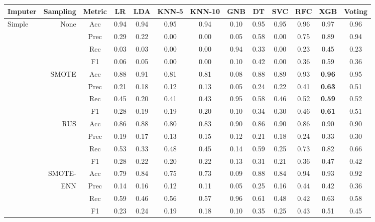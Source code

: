 \begin{table*}
\ContinuedFloat
\begin{narrow}{-1cm}{-1cm}
\begin{subtable}[t]{2.05\columnwidth}
    \centering
    \begin{tabular}{l|r|c|cccccccccc}
       Imputer & Sampling & Metric & LR & LDA & KNN-5 & KNN-10 & GNB & DT & SVC & RFC & XGB & Voting \\
        \hline \hline
        
        Simple & None & Acc & 0.94 & 0.94 & 0.95 & 0.94 & 0.10 & 0.95 & 0.95 & 0.96 & 0.97 & 0.96 \\
        ~ & ~ & Prec & 0.29 & 0.22 & 0.00 & 0.00 & 0.05 & 0.58 & 0.00 & 0.75 & 0.89 & 0.94 \\
        ~ & ~ & Rec & 0.03 & 0.03 & 0.00 & 0.00 & 0.94 & 0.33 & 0.00 & 0.23 & 0.45 & 0.23 \\
        ~ & ~ & F1 & 0.06 & 0.05 & 0.00 & 0.00 & 0.10 & 0.42 & 0.00 & 0.36 & 0.59 & 0.36 \\
        \cline{2-13}
        ~ & SMOTE & Acc & 0.88 & 0.91 & 0.81 & 0.81 & 0.08 & 0.88 & 0.89 & 0.93 & \textbf{0.96} & 0.95 \\
        ~ & ~ & Prec & 0.21 & 0.18 & 0.12 & 0.13 & 0.05 & 0.24 & 0.22 & 0.41 & \textbf{0.63} & 0.51 \\
        ~ & ~ & Rec & 0.45 & 0.20 & 0.41 & 0.43 & 0.95 & 0.58 & 0.46 & 0.52 & \textbf{0.59} & 0.52 \\
        ~ & ~ & F1 & 0.28 & 0.19 & 0.19 & 0.20 & 0.10 & 0.34 & 0.30 & 0.46 & \textbf{0.61} & 0.51 \\
        \cline{2-13}
        ~ & RUS & Acc & 0.86 & 0.88 & 0.80 & 0.83 & 0.90 & 0.86 & 0.90 & 0.86 & 0.90 & 0.90 \\
        ~ & ~ & Prec & 0.19 & 0.17 & 0.13 & 0.15 & 0.12 & 0.21 & 0.18 & 0.24 & 0.33 & 0.30 \\
        ~ & ~ & Rec & 0.53 & 0.33 & 0.48 & 0.45 & 0.14 & 0.59 & 0.25 & 0.73 & 0.82 & 0.66 \\
        ~ & ~ & F1 & 0.28 & 0.22 & 0.20 & 0.22 & 0.13 & 0.31 & 0.21 & 0.36 & 0.47 & 0.42 \\
        \cline{2-13}
        ~ & SMOTE- & Acc & 0.79 & 0.84 & 0.75 & 0.73 & 0.09 & 0.88 & 0.84 & 0.94 & 0.93 & 0.92 \\
        ~ & ENN & Prec & 0.14 & 0.16 & 0.12 & 0.11 & 0.05 & 0.25 & 0.16 & 0.44 & 0.42 & 0.36 \\
        ~ & ~ & Rec & 0.59 & 0.46 & 0.56 & 0.57 & 0.96 & 0.61 & 0.48 & 0.42 & 0.63 & 0.58 \\
        ~ & ~ & F1 & 0.23 & 0.24 & 0.19 & 0.18 & 0.10 & 0.35 & 0.25 & 0.43 & 0.51 & 0.45 \\
        \hline\hline


\end{tabular}
\end{subtable}
\end{narrow}
\end{table*}
